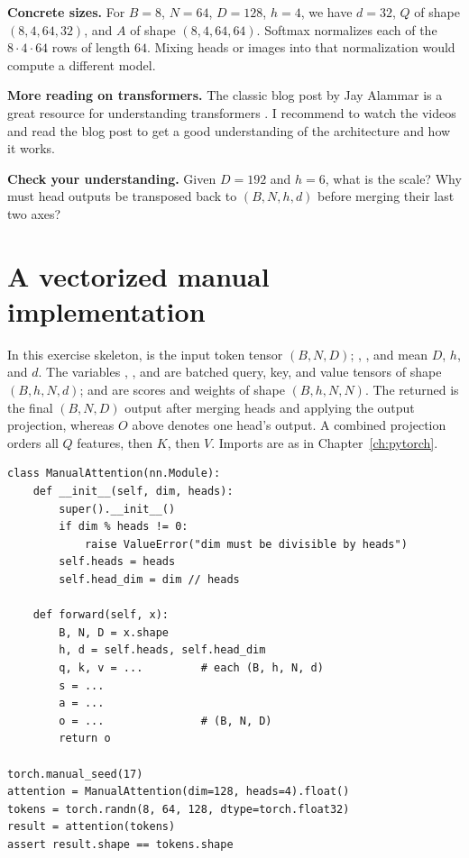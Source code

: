 \documentclass[11pt,a4paper,oneside]{report}
\newcommand{\code}[1]{\texttt{\detokenize{#1}}}
\newcommand{\checkpoint}[1]{\medskip\textbf{Check your understanding.} #1\par}
\begin{document}
\textbf{Concrete sizes.} For $B=8$, $N=64$, $D=128$, $h=4$, we have $d=32$,
$Q$ of shape $(8,4,64,32)$, and $A$ of shape $(8,4,64,64)$.
Softmax normalizes each of the $8\cdot4\cdot64$ rows of length $64$.
Mixing heads or images into that normalization would compute a different model.

\textbf{More reading on transformers.} The classic blog post by Jay Alammar is a great resource for understanding transformers \cite{alammar2018illustrated}.
I recommend to watch the videos and read the blog post to get a good understanding of the architecture and how it works.


\checkpoint{Given $D=192$ and $h=6$, what is the scale? Why must head
outputs be transposed back to $(B,N,h,d)$ before merging their last two axes?}

\newpage
\section{A vectorized manual implementation}
In this exercise skeleton, \code{x} is the input token tensor $(B,N,D)$;
\code{dim}, \code{heads}, and \code{head_dim} mean $D$, $h$, and $d$.
The variables \code{q}, \code{k}, and \code{v} are batched query, key, and
value tensors of shape $(B,h,N,d)$; \code{s} and \code{a} are scores and
weights of shape $(B,h,N,N)$. The returned \code{o} is the final $(B,N,D)$
output after merging heads and applying the output projection, whereas $O$
above denotes one head's output. A combined projection orders all $Q$
features, then $K$, then $V$. Imports are as in Chapter~\ref{ch:pytorch}.

\begin{lstlisting}[style=python]
class ManualAttention(nn.Module):
    def __init__(self, dim, heads):
        super().__init__()
        if dim % heads != 0:
            raise ValueError("dim must be divisible by heads")
        self.heads = heads
        self.head_dim = dim // heads

    def forward(self, x):
        B, N, D = x.shape
        h, d = self.heads, self.head_dim
        q, k, v = ...         # each (B, h, N, d)
        s = ...
        a = ...
        o = ...               # (B, N, D)
        return o

torch.manual_seed(17)
attention = ManualAttention(dim=128, heads=4).float()
tokens = torch.randn(8, 64, 128, dtype=torch.float32)
result = attention(tokens)
assert result.shape == tokens.shape
\end{lstlisting}
\end{document}
